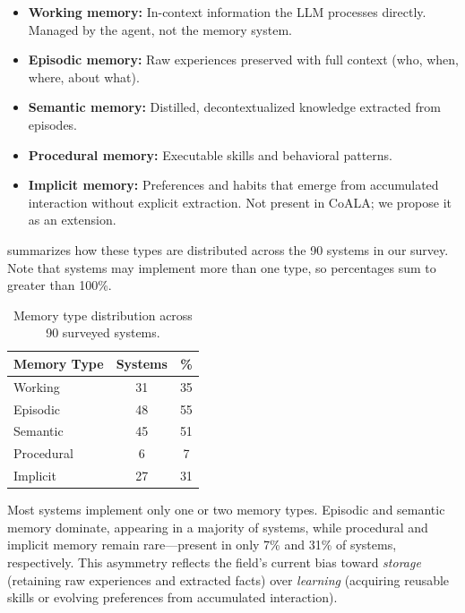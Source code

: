 \begin{itemize}[leftmargin=*, nosep]
    \item \textbf{Working memory:} In-context information the LLM
    processes directly. Managed by the agent, not the memory system.
    \item \textbf{Episodic memory:} Raw experiences preserved with
    full context (who, when, where, about what).
    \item \textbf{Semantic memory:} Distilled, decontextualized
    knowledge extracted from episodes.
    \item \textbf{Procedural memory:} Executable skills and
    behavioral patterns.
    \item \textbf{Implicit memory:} Preferences and habits that
    emerge from accumulated interaction without explicit extraction.
    Not present in CoALA; we propose it as an extension.
\end{itemize}

 summarizes how these types are distributed
across the 90 systems in our survey. Note that systems may implement
more than one type, so percentages sum to greater than 100\%.

\begin{table}[t]
    \centering
    \caption{Memory type distribution across 90 surveyed systems.}
    \label{tab:memory-type-dist}
    \begin{tabular}{lcc}
        \toprule
        \textbf{Memory Type} & \textbf{Systems} & \textbf{\%} \\
        \midrule
        Working      & 31 & 35 \\
        Episodic     & 48 & 55 \\
        Semantic     & 45 & 51 \\
        Procedural   &  6 &  7 \\
        Implicit     & 27 & 31 \\
        \bottomrule
    \end{tabular}
\end{table}

Most systems implement only one or two memory types.
Episodic and semantic memory dominate, appearing in a majority of
systems, while procedural and implicit memory remain rare---present in
only 7\% and 31\% of systems, respectively.
This asymmetry reflects the field's current bias toward
\emph{storage} (retaining raw experiences and extracted facts) over
\emph{learning} (acquiring reusable skills or evolving preferences from
accumulated interaction).

